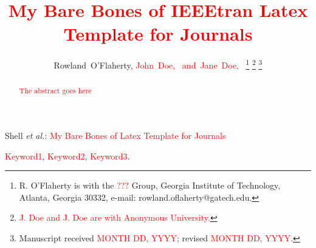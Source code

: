 \documentclass[journal]{IEEEtran}
\newcommand{\note}{\textcolor{red}} %
\begin{document}


\title{\note{My Bare Bones of IEEEtran Latex Template for Journals}}

\author{Rowland~O'Flaherty, \note{John~Doe,~ and~Jane~Doe,~}%
\thanks{R. O'Flaherty is with the \note{???} Group, Georgia Institute of Technology, Atlanta, Georgia 30332, e-mail: rowland.oflaherty@gatech.edu.}%
\thanks{\note{J. Doe and J. Doe are with Anonymous University.}}%
\thanks{Manuscript received \note{MONTH DD, YYYY}; revised \note{MONTH DD, YYYY.}}}

%
{Shell \MakeLowercase{\textit{et al.}}: \note{My Bare Bones of Latex Template for Journals}}


\maketitle

\begin{abstract}
\note{The abstract goes here}
\end{abstract}


\begin{IEEEkeywords}
\note{Keyword1}, \note{Keyword2}, \note{Keyword3}.
\end{IEEEkeywords}
\end{document}
